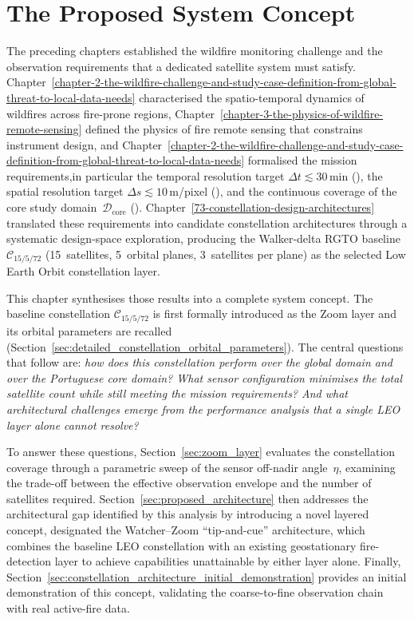 \chapter{The Proposed System
Concept}\label{chapter-9-the-proposed-system-concept}

The preceding chapters established the wildfire monitoring challenge and the observation requirements that a dedicated satellite system must satisfy.  Chapter~\ref{chapter-2-the-wildfire-challenge-and-study-case-definition-from-global-threat-to-local-data-needs} characterised the spatio-temporal dynamics of wildfires across fire-prone regions, Chapter~\ref{chapter-3-the-physics-of-wildfire-remote-sensing} defined the physics of fire remote sensing that constrains instrument design, and Chapter~\ref{chapter-2-the-wildfire-challenge-and-study-case-definition-from-global-threat-to-local-data-needs} formalised the mission requirements,in particular the temporal resolution target $\Delta t \lesssim 30$\,min (), the spatial resolution target $\Delta s \lesssim 10$\,m/pixel (), and the continuous coverage of the core study domain~$\mathcal{D}_{\text{core}}$ ().  Chapter~\ref{73-constellation-design-architectures} translated these requirements into candidate constellation architectures through a systematic design-space exploration, producing the Walker-delta RGTO baseline $\mathcal{C}_{15/5/72}$ (15~satellites, 5~orbital planes, 3~satellites per plane) as the selected Low Earth Orbit constellation layer.

This chapter synthesises those results into a complete system concept.  The baseline constellation $\mathcal{C}_{15/5/72}$ is first formally introduced as the Zoom layer and its orbital parameters are recalled (Section~\ref{sec:detailed_constellation_orbital_parameters}).  The central questions that follow are: \emph{how does this constellation perform over the global domain and over the Portuguese core domain?  What sensor configuration minimises the total satellite count while still meeting the mission requirements?  And what architectural challenges emerge from the performance analysis that a single LEO layer alone cannot resolve?}

To answer these questions, Section~\ref{sec:zoom_layer} evaluates the constellation coverage through a parametric sweep of the sensor off-nadir angle~$\eta$, examining the trade-off between the effective observation envelope and the number of satellites required.  Section~\ref{sec:proposed_architecture} then addresses the architectural gap identified by this analysis by introducing a novel layered concept, designated the Watcher--Zoom ``tip-and-cue'' architecture, which combines the baseline LEO constellation with an existing geostationary fire-detection layer to achieve capabilities unattainable by either layer alone.  Finally, Section~\ref{sec:constellation_architecture_initial_demonstration} provides an initial demonstration of this concept, validating the coarse-to-fine observation chain with real active-fire data.


